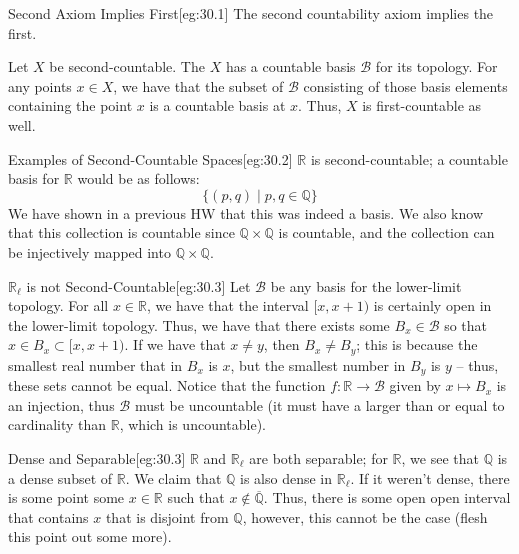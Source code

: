 \begin{egBox}{Second Axiom Implies First}[eg:30.1]
    The second countability axiom implies the first.

    \baseSkip

    Let \( X \) be second-countable.
    The \( X \) has a countable basis \( \mathcal{B} \) for its topology.
    For any points \( x \in X \), we have that the subset of \( \mathcal{B} \) 
    consisting of those basis elements containing the point \( x \) is a 
    countable basis at \( x \).
    Thus, \( X \) is first-countable as well.
\end{egBox}

\begin{egBox}{Examples of Second-Countable Spaces}[eg:30.2]
    \( \mathbb{R} \) is second-countable; a countable basis for \( \mathbb{R} \)
    would be as follows:
    \begin{equation*}
        \{ ( p, q ) \mid p, q \in \mathbb{Q} \}
    \end{equation*}
    We have shown in a previous HW that this was indeed a basis.
    We also know that this collection is countable since 
    \( \mathbb{Q} \times \mathbb{Q} \) is countable, and the collection 
    can be injectively mapped into \( \mathbb{Q} \times \mathbb{Q} \).
\end{egBox}

\begin{egBox}{\( \mathbb{R}_{ \ell } \) is not Second-Countable}[eg:30.3]
    Let \( \mathcal{B} \) be any basis for the lower-limit topology.
    For all \( x \in \mathbb{R} \), we have that the interval 
    \( [ x, x + 1 ) \) is certainly open in the lower-limit topology.
    Thus, we have that there exists some \( B_{ x } \in \mathcal{B} \) so
    that \( x \in B_{ x } \subset [ x, x + 1 ) \).
    If we have that \( x \neq y \), then \( B_{ x } \neq B_{ y } \);
    this is because the smallest real number that in \( B_{ x } \) is \( x \),
    but the smallest number in \( B_{ y } \) is \( y \) -- thus, these sets 
    cannot be equal.
    Notice that the function \( f: \mathbb{R} \rightarrow \mathcal{B} \)
    given by \( x \mapsto B_{ x } \) is an injection, thus \( \mathcal{B} \)
    must be uncountable (it must have a larger than or equal to cardinality
    than \( \mathbb{R} \), which is uncountable).
\end{egBox}

\begin{egBox}{Dense and Separable}[eg:30.3]
    \( \mathbb{R} \) and \( \mathbb{R}_{ \ell } \) are both separable;
    for \( \mathbb{R} \), we see that \( \mathbb{Q} \) is a dense subset of 
    \( \mathbb{R} \).
    We claim that \( \mathbb{Q} \) is also dense in \( \mathbb{R}_{ \ell } \).
    If it weren't dense, there is some point some \( x \in \mathbb{R} \) such
    that \( x \notin \overline{ \mathbb{Q} } \).
    Thus, there is some open open interval that contains \( x \) that is 
    disjoint from \( \mathbb{Q} \), however, this cannot be the case (flesh
    this point out some more).
\end{egBox}